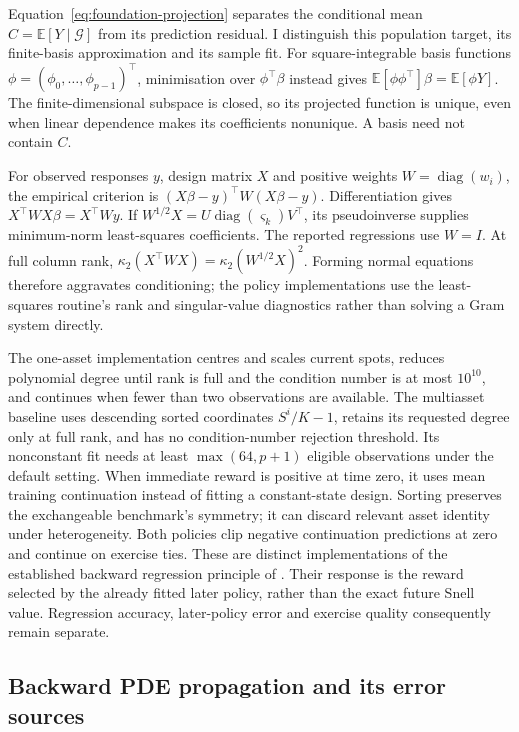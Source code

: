 \documentclass[11pt]{article}
\newcommand{\E}{\mathbb E}
\begin{document}
Equation~\eqref{eq:foundation-projection} separates the conditional mean $C=\E[Y\mid\mathcal G]$ from its prediction residual. I distinguish this population target, its finite-basis approximation and its sample fit. For square-integrable basis functions $\phi=(\phi_0,\ldots,\phi_{p-1})^\top$, minimisation over $\phi^\top\beta$ instead gives $\E[\phi\phi^\top]\beta=\E[\phi Y]$. The finite-dimensional subspace is closed, so its projected function is unique, even when linear dependence makes its coefficients nonunique. A basis need not contain $C$.

For observed responses $y$, design matrix $X$ and positive weights $W=\operatorname{diag}(w_i)$, the empirical criterion is $(X\beta-y)^\top W(X\beta-y)$. Differentiation gives $X^\top WX\beta=X^\top Wy$. If $W^{1/2}X=U\operatorname{diag}(\varsigma_k)V^\top$, its pseudoinverse supplies minimum-norm least-squares coefficients. The reported regressions use $W=I$. At full column rank, $\kappa_2(X^\top WX)=\kappa_2(W^{1/2}X)^2$. Forming normal equations therefore aggravates conditioning; the policy implementations use the least-squares routine's rank and singular-value diagnostics rather than solving a Gram system directly.

The one-asset implementation centres and scales current spots, reduces polynomial degree until rank is full and the condition number is at most $10^{10}$, and continues when fewer than two observations are available. The multiasset baseline uses descending sorted coordinates $S^i/K-1$, retains its requested degree only at full rank, and has no condition-number rejection threshold. Its nonconstant fit needs at least $\max(64,p+1)$ eligible observations under the default setting. When immediate reward is positive at time zero, it uses mean training continuation instead of fitting a constant-state design. Sorting preserves the exchangeable benchmark's symmetry; it can discard relevant asset identity under heterogeneity. Both policies clip negative continuation predictions at zero and continue on exercise ties. These are distinct implementations of the established backward regression principle of \citet{longstaff2001}. Their response is the reward selected by the already fitted later policy, rather than the exact future Snell value. Regression accuracy, later-policy error and exercise quality consequently remain separate.

\subsection{Backward PDE propagation and its error sources}
\end{document}
